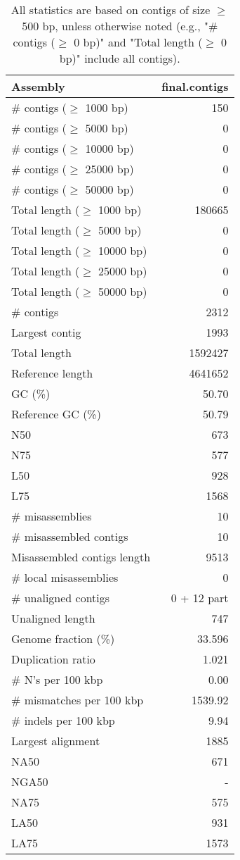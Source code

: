 \documentclass[12pt,a4paper]{article}
\begin{document}
\begin{table}[ht]
\begin{center}
\caption{All statistics are based on contigs of size $\geq$ 500 bp, unless otherwise noted (e.g., "\# contigs ($\geq$ 0 bp)" and "Total length ($\geq$ 0 bp)" include all contigs).}
\begin{tabular}{|l*{1}{|r}|}
\hline
Assembly & final.contigs \\ \hline
\# contigs ($\geq$ 1000 bp) & 150 \\ \hline
\# contigs ($\geq$ 5000 bp) & 0 \\ \hline
\# contigs ($\geq$ 10000 bp) & 0 \\ \hline
\# contigs ($\geq$ 25000 bp) & 0 \\ \hline
\# contigs ($\geq$ 50000 bp) & 0 \\ \hline
Total length ($\geq$ 1000 bp) & 180665 \\ \hline
Total length ($\geq$ 5000 bp) & 0 \\ \hline
Total length ($\geq$ 10000 bp) & 0 \\ \hline
Total length ($\geq$ 25000 bp) & 0 \\ \hline
Total length ($\geq$ 50000 bp) & 0 \\ \hline
\# contigs & 2312 \\ \hline
Largest contig & 1993 \\ \hline
Total length & 1592427 \\ \hline
Reference length & 4641652 \\ \hline
GC (\%) & 50.70 \\ \hline
Reference GC (\%) & 50.79 \\ \hline
N50 & 673 \\ \hline
N75 & 577 \\ \hline
L50 & 928 \\ \hline
L75 & 1568 \\ \hline
\# misassemblies & 10 \\ \hline
\# misassembled contigs & 10 \\ \hline
Misassembled contigs length & 9513 \\ \hline
\# local misassemblies & 0 \\ \hline
\# unaligned contigs & 0 + 12 part \\ \hline
Unaligned length & 747 \\ \hline
Genome fraction (\%) & 33.596 \\ \hline
Duplication ratio & 1.021 \\ \hline
\# N's per 100 kbp & 0.00 \\ \hline
\# mismatches per 100 kbp & 1539.92 \\ \hline
\# indels per 100 kbp & 9.94 \\ \hline
Largest alignment & 1885 \\ \hline
NA50 & 671 \\ \hline
NGA50 & - \\ \hline
NA75 & 575 \\ \hline
LA50 & 931 \\ \hline
LA75 & 1573 \\ \hline
\end{tabular}
\end{center}
\end{table}
\end{document}
